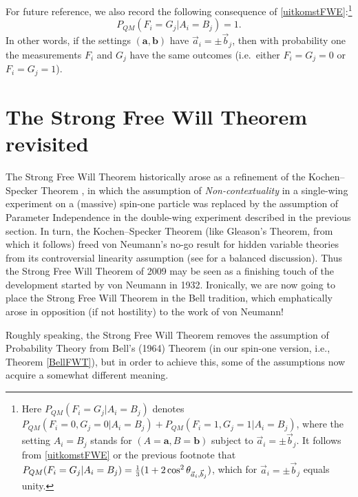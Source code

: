 \documentclass[12pt]{article}
\newcommand{\third}{\mbox{\footnotesize $\frac{1}{3}$}}
\newcommand{\er}{\eqref}
\newcommand{\ba}{\mathbf{a}}\newcommand{\bb}{\mathbf{b}}
\begin{document}
 For future reference, we also record the following consequence of \er{uitkomstFWE}:\footnote{Here $P_{QM}(F_i=G_j|A_i=B_j)$ denotes $P_{QM}(F_i=0,G_j=0|A_i=B_j)+P_{QM}(F_i=1,G_j=1|A_i=B_j)$, where the setting $A_i=B_j$ stands for $(A=\ba,B=\bb)$ subject to $\vec{a}_i=\pm\vec{b}_j$. It follows from \er{uitkomstFWE} or the previous footnote that $P_{QM}(F_i=G_j|A_i=B_j)=\third(1+2\cos^2 \theta_{\vec{a}_i,\vec{b}_j})$, which for $\vec{a}_i=\pm\vec{b}_j$ equals unity.}
\begin{equation}
P_{QM}(F_i=G_j|A_i=B_j)=1.\label{CKpc}
\end{equation}
In other words, if the settings $(\ba,\bb)$ have $\vec{a}_i=\pm\vec{b}_j$, then  with probability one the measurements $F_i$ and $G_j$ have the same outcomes (i.e.\ either $F_i=G_j=0$ or $F_i=G_j=1$).
\section{The Strong Free Will Theorem revisited}\label{FWTsec}
The Strong Free Will Theorem \cite{CK2} historically arose as a refinement of the Kochen--Specker Theorem \cite{Bell2,KS}, in which the assumption of \emph{Non-contextuality} in a single-wing experiment on a (massive) spin-one particle was replaced by the assumption of Parameter Independence in the double-wing experiment described in the previous section. In turn, the Kochen--Specker Theorem (like Gleason's Theorem, from which it follows) freed von Neumann's no-go result for hidden variable theories \cite{vN32} from its controversial linearity assumption (see \cite{Bub2} for a balanced discussion). Thus the Strong Free Will Theorem of 2009  may be seen as a finishing touch of the development started by von Neumann in 1932.
 Ironically, we are now going to place the  Strong Free Will Theorem in the Bell tradition, which emphatically arose in opposition (if not hostility) to the work of von Neumann! 
 
 Roughly speaking, the Strong Free Will Theorem removes the assumption of Probability Theory from Bell's (1964) Theorem (in our spin-one version, i.e., Theorem \ref{BellFWT}), but in order to achieve this, some of the assumptions now acquire a somewhat different meaning.
\end{document}
